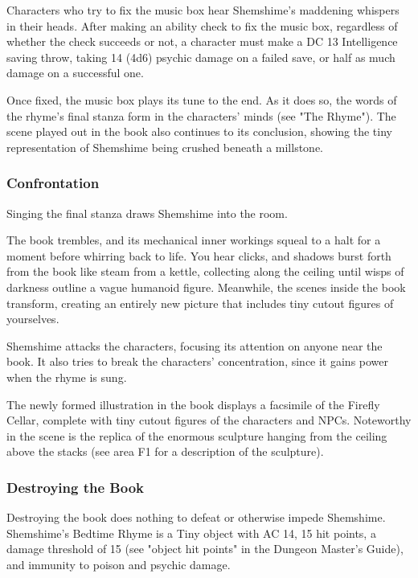 \documentclass[10pt,a4paper,twoside,bg=print,twocolumn,openany,nodeprecatedcode]{dndbook}
\begin{document}
Characters who try to fix the music box hear Shemshime's maddening whispers in their heads. After making an ability check to fix the music box, regardless of whether the check succeeds or not, a character must make a DC 13 Intelligence saving throw, taking 14 (4d6) psychic damage on a failed save, or half as much damage on a successful one.

Once fixed, the music box plays its tune to the end. As it does so, the words of the rhyme's final stanza form in the characters' minds (see "The Rhyme"). The scene played out in the book also continues to its conclusion, showing the tiny representation of Shemshime being crushed beneath a millstone.

\subsubsection{Confrontation}
Singing the final stanza draws Shemshime into the room.

\begin{DndReadAloud}{}
The book trembles, and its mechanical inner workings squeal to a halt for a moment before whirring back to life. You hear clicks, and shadows burst forth from the book like steam from a kettle, collecting along the ceiling until wisps of darkness outline a vague humanoid figure. Meanwhile, the scenes inside the book transform, creating an entirely new picture that includes tiny cutout figures of yourselves.

\end{DndReadAloud}

Shemshime attacks the characters, focusing its attention on anyone near the book. It also tries to break the characters' concentration, since it gains power when the rhyme is sung.

The newly formed illustration in the book displays a facsimile of the Firefly Cellar, complete with tiny cutout figures of the characters and NPCs. Noteworthy in the scene is the replica of the enormous sculpture hanging from the ceiling above the stacks (see area F1 for a description of the sculpture).

\subsubsection{Destroying the Book}
Destroying the book does nothing to defeat or otherwise impede Shemshime. Shemshime's Bedtime Rhyme is a Tiny object with AC 14, 15 hit points, a damage threshold of 15 (see "object hit points" in the Dungeon Master's Guide), and immunity to poison and psychic damage.
\end{document}
